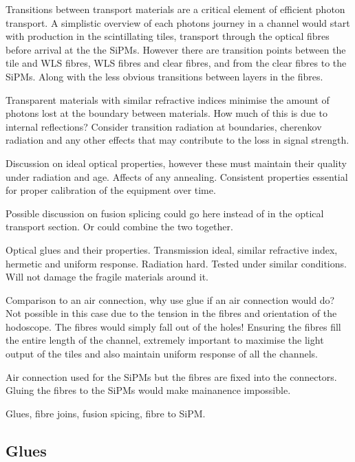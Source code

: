 Transitions between transport materials are a critical element of efficient photon transport. A simplistic overview of each photons journey in a channel would start with production in the scintillating tiles, transport through the optical fibres before arrival at the the SiPMs. However there are transition points between the tile and WLS fibres, WLS fibres and clear fibres, and from the clear fibres to the SiPMs. Along with the less obvious transitions between layers in the fibres.  

Transparent materials with similar refractive indices minimise the amount of photons lost at the boundary between materials. How much of this is due to internal reflections? Consider transition radiation at boundaries, cherenkov radiation and any other effects that may contribute to the loss in signal strength.

Discussion on ideal optical properties, however these must maintain their quality under radiation and age. Affects of any annealing. Consistent properties essential for proper calibration of the equipment over time.

Possible discussion on fusion splicing could go here instead of in the optical transport section. Or could combine the two together.

Optical glues and their properties. Transmission ideal, similar refractive index, hermetic and uniform response. Radiation hard. Tested under similar conditions. Will not damage the fragile materials around it.

Comparison to an air connection, why use glue if an air connection would do? Not possible in this case due to the tension in the fibres and orientation of the hodoscope. The fibres would simply fall out of the holes! Ensuring the fibres fill the entire length of the channel, extremely important to maximise the light output of the tiles and also maintain uniform response of all the channels.

Air connection used for the SiPMs but the fibres are fixed into the connectors. Gluing the fibres to the SiPMs would make mainanence impossible. 

Glues, fibre joins, fusion spicing, fibre to SiPM.
\subsection{Glues}
\cite{kobayashi1991transmittance}
\cite{kirn1999absorption}
\cite{clements2006selection}
\cite{montecchi2001study}
\cite{cohen2003optical}
\cite{cohen2001optical}
\cite{va2014optical}

